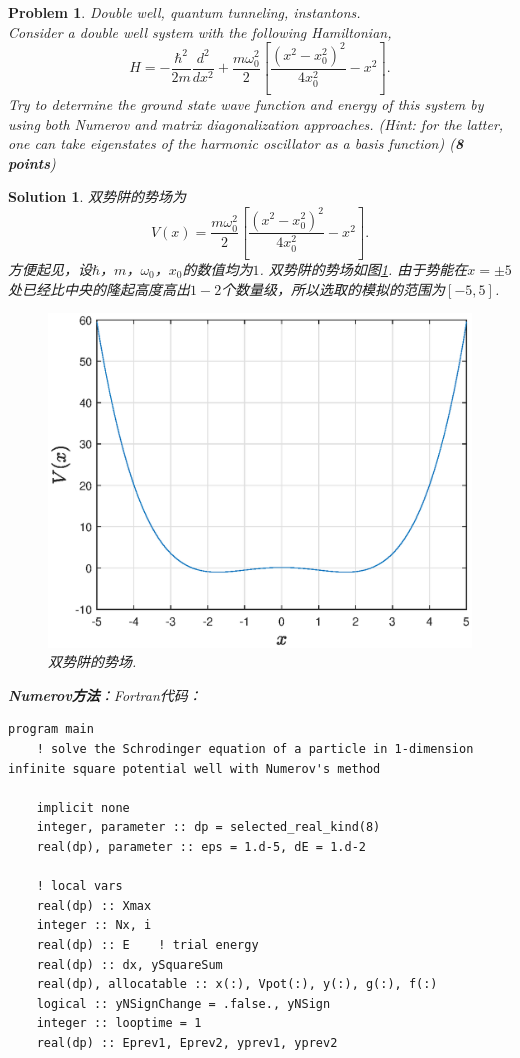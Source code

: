 \documentclass[UTF8,10pt,a4paper]{article}
\theoremstyle{Problem}
\newtheorem{prob}{Problem}
\theoremstyle{Solution}
\newtheorem*{sol}{Solution}
\begin{document}
\begin{prob}
    Double well, quantum tunneling, instantons.\\
    Consider a double well system with the following Hamiltonian,
    \begin{equation}
        H=-\frac{\hbar^2}{2m}\frac{d^2}{dx^2}+\frac{m\omega_0^2}{2}\left[\frac{(x^2-x_0^2)^2}{4x_0^2}-x^2\right].
    \end{equation}
    Try to determine the ground state wave function and energy of this system by using both Numerov and matrix diagonalization approaches. (Hint: for the latter, one can take eigenstates of the harmonic oscillator as a basis function) (\textbf{8 points})
\end{prob}
\begin{sol}
    双势阱的势场为
    \begin{equation}
        V(x)=\frac{m\omega_0^2}{2}\left[\frac{(x^2-x_0^2)^2}{4x_0^2}-x^2\right].
    \end{equation}
    方便起见，设$\hbar$，$m$，$\omega_0$，$x_0$的数值均为$1$. 双势阱的势场如图\ref{4-Vpot}. 由于势能在$x=\pm 5$处已经比中央的隆起高度高出$1-2$个数量级，所以选取的模拟的范围为$[-5,5]$.
    \begin{figure}[h]
        \centering
        \includegraphics[width=.4\textwidth]{4-Vpot.eps}
        \caption{双势阱的势场.}
        \label{4-Vpot}
    \end{figure}

    \textbf{Numerov方法}：Fortran代码：
    \begin{lstlisting}
program main
    ! solve the Schrodinger equation of a particle in 1-dimension infinite square potential well with Numerov's method

    implicit none
    integer, parameter :: dp = selected_real_kind(8)
    real(dp), parameter :: eps = 1.d-5, dE = 1.d-2

    ! local vars
    real(dp) :: Xmax
    integer :: Nx, i
    real(dp) :: E    ! trial energy
    real(dp) :: dx, ySquareSum
    real(dp), allocatable :: x(:), Vpot(:), y(:), g(:), f(:)
    logical :: yNSignChange = .false., yNSign
    integer :: looptime = 1
    real(dp) :: Eprev1, Eprev2, yprev1, yprev2


\end{lstlisting}
\end{sol}
\end{document}
